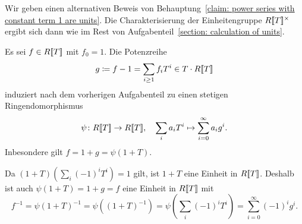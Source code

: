 \documentclass[a4paper, 10pt, numbers=noenddot]{scrartcl}
\begin{document}
\section{}

Wir geben einen alternativen Beweis von Behauptung~\ref{claim: power series with constant term 1 are units}.
Die Charakterisierung der Einheitengruppe $R[\![T]\!]^\times$ ergibt sich dann wie im Rest von Aufgabenteil~\ref{section: calculation of units}.

Es sei $f \in R[\![T]\!]$ mit $f_0 = 1$.
Die Potenzreihe
\[
            g
  \coloneqq f-1
  =         \sum_{i \geq 1} f_i T^i
  \in       T \cdot R[\![T]\!]
\]
induziert nach dem vorherigen Aufgabenteil zu einen stetigen Ringendomorphismus
\[
  \psi \colon R[\![T]\!] \to R[\![T]\!],
  \quad
  \sum_i a_i T^i \mapsto \sum_{i=0}^\infty a_i g^i.
\]
Inbesondere gilt $f = 1 + g = \psi(1 + T)$.

Da $(1 + T)(\sum_i (-1)^i T^i) = 1$ gilt, ist $1 + T$ eine Einheit in $R[\![T]\!]$.
Deshalb ist auch $\psi(1 + T) = 1 + g = f$ eine Einheit in $R[\![T]\!]$ mit
\[
    f^{-1}
  = \psi(1 + T)^{-1}
  = \psi\left( (1 + T)^{-1} \right)
  = \psi\left( \sum_i (-1)^i T^i \right)
  = \sum_{i=0}^\infty (-1)^i g^i.
\]
\end{document}
